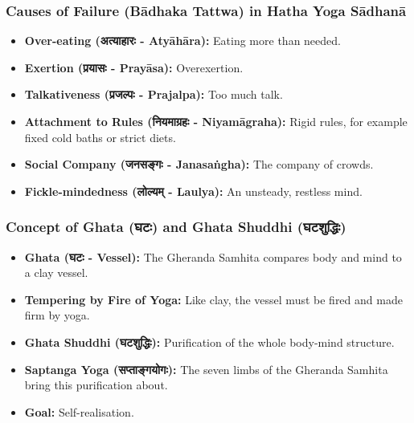 \begin{frame}[fragile]\frametitle{Causes of Failure (Bādhaka Tattwa) in Hatha Yoga Sādhanā}
\begin{itemize}
    \item \textbf{Over-eating (अत्याहारः - Atyāhāra):} Eating more than needed.
    \item \textbf{Exertion (प्रयासः - Prayāsa):} Overexertion.
    \item \textbf{Talkativeness (प्रजल्पः - Prajalpa):} Too much talk.
    \item \textbf{Attachment to Rules (नियमाग्रहः - Niyamāgraha):} Rigid rules, for example fixed cold baths or strict diets.
    \item \textbf{Social Company (जनसङ्गः - Janasaṅgha):} The company of crowds.
    \item \textbf{Fickle-mindedness (लोल्यम् - Laulya):} An unsteady, restless mind.
\end{itemize}
\end{frame}

\begin{frame}[fragile]\frametitle{Concept of Ghata (घटः) and Ghata Shuddhi (घटशुद्धिः)}
\begin{itemize}
    \item \textbf{Ghata (घटः - Vessel):} The Gheranda Samhita compares body and mind to a clay vessel.
    \item \textbf{Tempering by Fire of Yoga:} Like clay, the vessel must be fired and made firm by yoga.
    \item \textbf{Ghata Shuddhi (घटशुद्धिः):} Purification of the whole body-mind structure.
    \item \textbf{Saptanga Yoga (सप्ताङ्गयोगः):} The seven limbs of the Gheranda Samhita bring this purification about.
    \item \textbf{Goal:} Self-realisation.
\end{itemize}
\end{frame}

